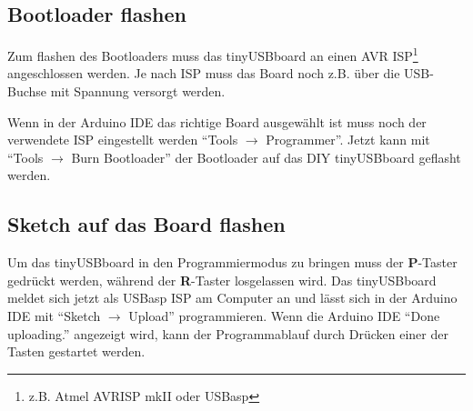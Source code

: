 \subsection{Bootloader flashen}
Zum flashen des Bootloaders muss das tinyUSBboard an einen AVR ISP\footnote{z.B. Atmel AVRISP mkII oder USBasp} angeschlossen werden. Je nach ISP muss das Board noch z.B. über die USB-Buchse mit Spannung versorgt werden.

Wenn in der Arduino IDE das richtige Board ausgewählt ist muss noch der verwendete ISP eingestellt werden \enquote{Tools $\rightarrow$ Programmer}. Jetzt kann mit \enquote{Tools $\rightarrow$ Burn Bootloader} der Bootloader auf das DIY tinyUSBboard geflasht werden.

\subsection{Sketch auf das Board flashen}
Um das tinyUSBboard in den Programmiermodus zu bringen muss der \textbf{P}-Taster gedrückt werden, während der \textbf{R}-Taster losgelassen wird. Das tinyUSBboard meldet sich jetzt als USBasp ISP am Computer an und lässt sich in der Arduino IDE mit \enquote{Sketch $\rightarrow$ Upload} programmieren. Wenn die Arduino IDE \enquote{Done uploading.} angezeigt wird, kann der Programmablauf durch Drücken einer der Tasten gestartet werden. 



